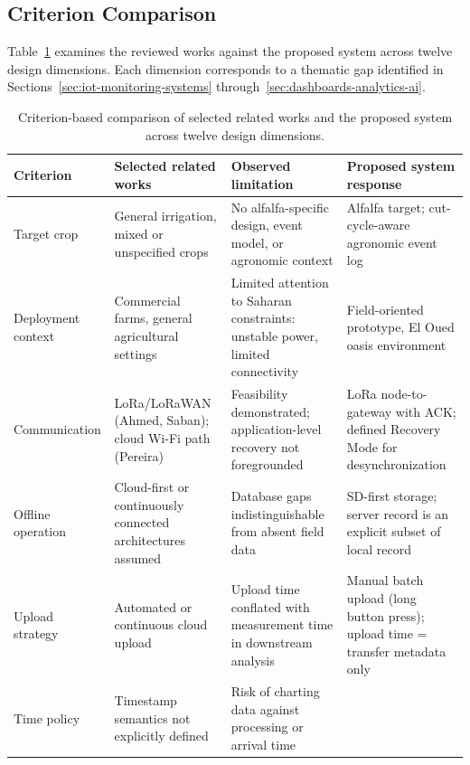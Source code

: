 \subsection*{Criterion Comparison}

Table~\ref{tab:related-work-comparison} examines the reviewed works against the
proposed system across twelve design dimensions. Each dimension corresponds to
a thematic gap identified in Sections~\ref{sec:iot-monitoring-systems}
through~\ref{sec:dashboards-analytics-ai}.

\begin{table}[H]
  \centering
  \caption{Criterion-based comparison of selected related works and the proposed
           system across twelve design dimensions.}
  \label{tab:related-work-comparison}
  \renewcommand{\arraystretch}{1.3}
  \begin{tabular}{|p{2.5cm}|p{3.0cm}|p{3.3cm}|p{3.3cm}|}
    \hline
    \textbf{Criterion} & \textbf{Selected related works} &
    \textbf{Observed limitation} & \textbf{Proposed system response} \\
    \hline
    Target crop &
    General irrigation, mixed or unspecified crops &
    No alfalfa-specific design, event model, or agronomic context &
    Alfalfa target; cut-cycle-aware agronomic event log \\
    \hline
    Deployment context &
    Commercial farms, general agricultural settings &
    Limited attention to Saharan constraints: unstable power, limited connectivity &
    Field-oriented prototype, El Oued oasis environment \\
    \hline
    Communication &
    LoRa/LoRaWAN (Ahmed, Saban); cloud Wi-Fi path (Pereira) &
    Feasibility demonstrated; application-level recovery not foregrounded &
    LoRa node-to-gateway with ACK; defined Recovery Mode for desynchronization \\
    \hline
    Offline operation &
    Cloud-first or continuously connected architectures assumed &
    Database gaps indistinguishable from absent field data &
    SD-first storage; server record is an explicit subset of local record \\
    \hline
    Upload strategy &
    Automated or continuous cloud upload &
    Upload time conflated with measurement time in downstream analysis &
    Manual batch upload (long button press); upload time = transfer metadata only \\
    \hline
    Time policy &
    Timestamp semantics not explicitly defined &
    Risk of charting data against processing or arrival time &

\end{tabular}
\end{table}
